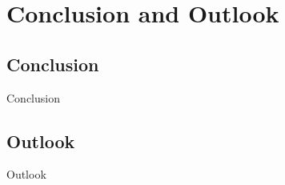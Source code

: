\chapter{Conclusion and Outlook}

\section{Conclusion}

Conclusion

\section{Outlook}

Outlook       